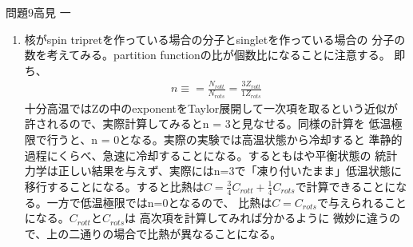 \documentclass[fleqn]{jbook}
\begin{document}
\begin{answer}{問題9}{高見 一}
\begin{enumerate}
\item 核がspin tripretを作っている場合の分子とsingletを作っている場合の
分子の数を考えてみる。partition functionの比が個数比になることに注意する。
即ち、
\begin{eqnarray*}
n \equiv = \frac{N_{rott}}{N_{rots}} = \frac{3 Z_{rott}}{1 Z_{rots}}
\end{eqnarray*}
十分高温ではZの中のexponentをTaylor展開して一次項を取るという近似が
許されるので、実際計算してみるとn = 3と見なせる。同様の計算を
低温極限で行うと、n = 0となる。実際の実験では高温状態から冷却すると
準静的過程にくらべ、急速に冷却することになる。するともはや平衡状態の
統計力学は正しい結果を与えず、実際にはn=3で「凍り付いたまま」低温状態に
移行することになる。すると比熱は$\displaystyle C = \frac{3}{4}C_{rott} + 
\frac{1}{4}C_{rots}$で計算できることになる。一方で低温極限ではn=0となるので、
比熱は$C = C_{rots}$で与えられることになる。$C_{rott}$と$C_{rots}$は
高次項を計算してみれば分かるように
微妙に違うので、上の二通りの場合で比熱が異なることになる。 
\end{enumerate}
\end{answer}
\end{document}
